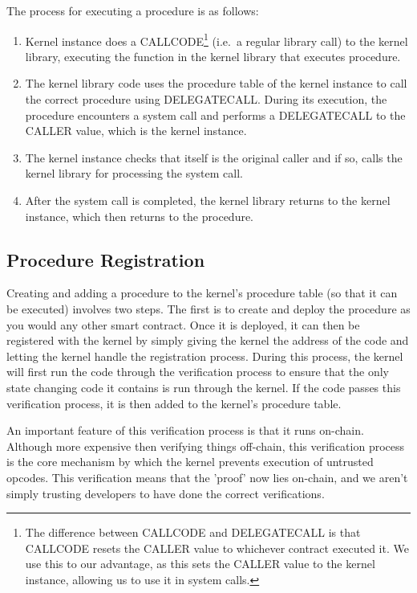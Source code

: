 \documentclass[english,a4paper]{article}
\begin{document}
The process for executing a procedure is as follows:

\begin{enumerate}
\def\labelenumi{\arabic{enumi}.}
\item
  Kernel instance does a CALLCODE\footnote{The difference between CALLCODE and
  DELEGATECALL is that CALLCODE resets the CALLER value to whichever contract
  executed it. We use this to our advantage, as this sets the CALLER value to
  the kernel instance, allowing us to use it in system calls.} (i.e.~a regular
  library call) to the kernel
  library, executing the function in the kernel library that executes
  procedure.
\item
  The kernel library code uses the procedure table of the kernel
  instance to call the correct procedure using DELEGATECALL. During its
  execution, the procedure encounters a system call and performs a
  DELEGATECALL to the CALLER value, which is the kernel instance.
\item
  The kernel instance checks that itself is the original caller and if
  so, calls the kernel library for processing the system call.
\item
  After the system call is completed, the kernel library returns to the
  kernel instance, which then returns to the procedure.
\end{enumerate}

\subsection{Procedure Registration}\label{procedure-creation}
Creating and adding a procedure to the kernel's procedure table (so that it can
be executed) involves two steps. The first is to create and deploy the procedure
as you would any other smart contract. Once it is deployed, it can then be
registered with the kernel by simply giving the kernel the address of the code
and letting the kernel handle the registration process. During this process, the
kernel will first run the code through the verification process to ensure that
the only state changing code it contains is run through the kernel. If the code
passes this verification process, it is then added to the kernel's procedure
table.

An important feature of this verification process is that it runs on-chain.
Although more expensive then verifying things off-chain, this verification
process is the core mechanism by which the kernel prevents execution of
untrusted opcodes. This verification means that the 'proof' now lies on-chain,
and we aren't simply trusting developers to have done the correct verifications.
\end{document}
